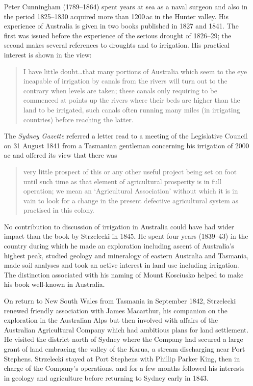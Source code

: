 Peter Cunningham (1789--1864) spent years at sea as a naval surgeon
and also in the period 1825--1830 acquired more than 1200\,ac in
the Hunter valley.  His experience of Australia is given in two books
published in 1827 and 1841.  The first was issued before the
experience of the serious drought of 1826--29; the second makes
several references to droughts and to irrigation. His practical
interest is shown in the view:
\begin{quote}
	I have little doubt\ldots that many portions of Australia
	which seem to the eye incapable of irrigation by canals from
	the rivers will turn out to the contrary when levels are
	taken; these canals only requiring to be commenced at points
	up the rivers where their beds are higher than the land to be
	irrigated, such canals often running many miles (in irrigating
	countries) before reaching the
	latter.
\end{quote}

The \textsl{Sydney Gazette} referred a letter read to a meeting of the
Legislative Council on 31 August 1841 from a Tasmanian gentleman
concerning his irrigation of 2000\,ac and offered its view that there
was
\begin{quote}
	very little prospect of this or any other useful project being
	set on foot until such time as that element of agricultural
	prosperity is in full operation; we mean an `Agricultural
	Association' without which it is in vain to look for a change
	in the present defective agricultural system as practised in
	this colony.
\end{quote}

No contribution to discussion of irrigation in Australia could have
had wider impact than the book by Strzelecki in 1845.  He spent four
years (1839--43) in the country during which he made an exploration
including ascent of Australia's highest peak, studied geology and
mineralogy of eastern Australia and Tasmania, made soil analyses and
took an active interest in land use including irrigation.  The
distinction associated with his naming of Mount Kosciusko helped to
make his book well-known in Australia.

On return to New South Wales from Tasmania in September 1842,
Strzelecki renewed friendly association with James Macarthur, his
companion on the exploration in the Australian Alps but then involved
with affairs of the Australian Agricultural Company which had
ambitious plans for land settlement.  He visited the district north of
Sydney where the Company had secured a large grant of land embracing
the valley of the Karua, a stream discharging near Port Stephens.
Strzelecki stayed at Port Stephens with Phillip Parker King, then in
charge of the Company's operations, and for a few months followed his
interests in geology and agriculture before returning to Sydney early
in 1843.

